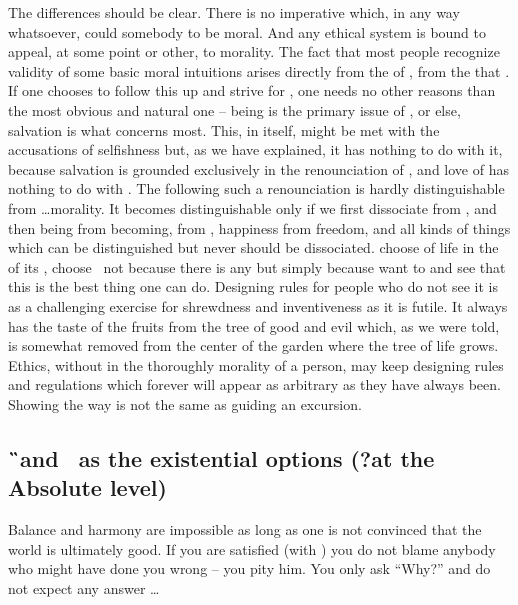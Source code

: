 {{\pa The differences should be clear.  There is no 
imperative which, in any way whatsoever, could  somebody to
be moral.  And any ethical system is bound to appeal, at some point or
other, to morality.  The fact that most people recognize validity of
some basic moral intuitions arises directly from the  of
, from the  that .  If one chooses to follow this up and strive for
, one needs no other reasons than the most
obvious and natural one --  being is the primary issue of
, or else,  salvation is what concerns 
most.  This, in itself, might be met with the accusations of
selfishness but, as we have explained, it has nothing to do with it,
because  salvation is grounded exclusively in the renounciation
of , and love of  has nothing to do with . The  following such a 
renounciation is hardly distinguishable from \ldots morality.  It
becomes distinguishable only if we first dissociate  from 
, and then being from
becoming,  from , happiness from freedom, and all
kinds of things which can be distinguished but never should be
dissociated.  
 choose  of life in the
 of its ,  choose \yes\ not because
there is any  but simply because  want to and see
that this is the best thing one can do.  Designing rules for people
who do not see it is as a challenging exercise for shrewdness and
inventiveness as it is futile.  It always has the taste of the fruits from the 
tree of good and evil which, as we were told, is somewhat removed from 
the center of the garden where the tree of life grows. 
Ethics, without  in the
thoroughly  morality of a person, may keep designing
rules and regulations which forever will appear as arbitrary as they
have always been.  Showing the way is not the same as guiding an
excursion.





\newpage 
\subsection{\G\ and \B\ as the existential options (?at the Absolute level)}
%
%
\pa
Balance and harmony are impossible as long as one is not convinced that
the world is ultimately good.
\pa
If you are satisfied (with ) you do not blame anybody who might have done
you wrong -- you pity him. You only ask ``Why?'' and do not expect any 
answer \ldots

}}
